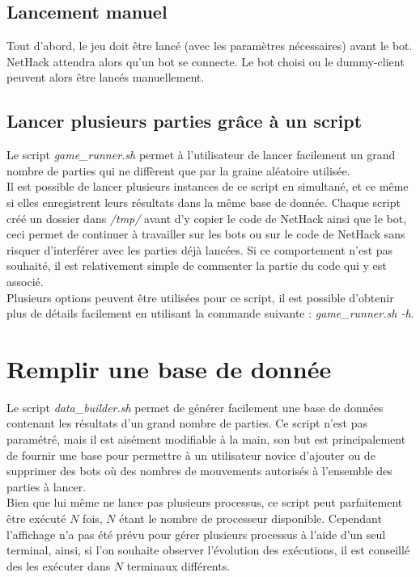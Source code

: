 \documentclass[10pt,a4paper]{report}
\begin{document}
\subsection{Lancement manuel}

Tout d'abord, le jeu doit être lancé (avec les paramètres nécessaires) avant le bot. NetHack attendra alors qu'un bot se connecte. Le bot choisi ou le dummy-client peuvent alors être lancés manuellement.

\subsection{Lancer plusieurs parties grâce à un script}
Le script \emph{game\_runner.sh} permet à l'utilisateur de lancer facilement
un grand nombre de parties qui ne diffèrent que par la graine aléatoire
utilisée.
\\
Il est possible de lancer plusieurs instances de ce script en simultané, et ce
même si elles enregistrent leurs résultats dans la même base de donnée. Chaque
script créé un dossier dans \emph{/tmp/} avant d'y copier le code de NetHack ainsi que
le bot, ceci permet de continuer à travailler sur les bots ou sur le code de
NetHack sans risquer d'interférer avec les parties déjà lancées. Si ce
comportement n'est pas souhaité, il est relativement simple de commenter la
partie du code qui y est associé.
\\
Plusieurs options peuvent être utilisées pour ce script, il est possible
d'obtenir plus de détails facilement en utilisant la commande suivante :
\emph{game\_runner.sh -h}.

\section{Remplir une base de donnée}
Le script \emph{data\_builder.sh} permet de générer facilement une base de
données contenant les résultats d'un grand nombre de parties. Ce script n'est
pas paramétré, mais il est aisément modifiable à la main, son but est
principalement de fournir une base pour permettre à un utilisateur novice
d'ajouter ou de supprimer des bots où des nombres de mouvements autorisés à
l'ensemble des parties à lancer.
\\
Bien que lui même ne lance pas plusieurs processus, ce script peut
parfaitement être exécuté $N$ fois, $N$ étant le nombre de processeur
disponible. Cependant l'affichage n'a pas été prévu pour gérer plusieurs
processus à l'aide d'un seul terminal, ainsi, si l'on souhaite observer
l'évolution des exécutions, il est conseillé des les exécuter dans $N$
terminaux différents.
\end{document}

